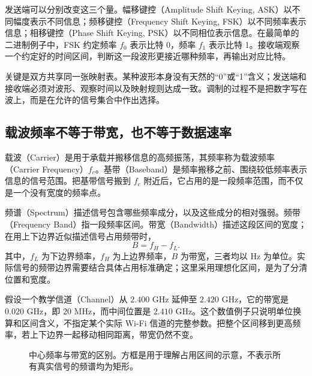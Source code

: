发送端可以分别改变这三个量。幅移键控（Amplitude Shift Keying, ASK）以不同幅度表示不同信息；频移键控（Frequency Shift Keying, FSK）以不同频率表示信息；相移键控（Phase Shift Keying, PSK）以不同相位表示信息。在最简单的二进制例子中，FSK 约定频率 $f_0$ 表示比特 0，频率 $f_1$ 表示比特 1。接收端观察一个约定好的时间区间，判断这一段波形更接近哪种频率，再输出对应比特。

关键是双方共享同一张映射表。某种波形本身没有天然的“0”或“1”含义；发送端和接收端必须对波形、观察时间以及映射规则达成一致。调制的过程不是把数字写在波上，而是在允许的信号集合中作出选择。

\subsection{载波频率不等于带宽，也不等于数据速率}
载波（Carrier）是用于承载并搬移信息的高频振荡，其频率称为载波频率（Carrier Frequency）$f_c$。基带（Baseband）是频率搬移之前、围绕较低频率表示信息的信号范围。把基带信号搬到 $f_c$ 附近后，它占用的是一段频率范围，而不仅是一个没有宽度的频率点。

频谱（Spectrum）描述信号包含哪些频率成分，以及这些成分的相对强弱。频带（Frequency Band）指一段频率区间。带宽（Bandwidth）描述这段区间的宽度；在用上下边界近似描述信号占用频带时，
\begin{equation}
B=f_H-f_L.
\end{equation}
其中，$f_L$ 为下边界频率，$f_H$ 为上边界频率，$B$ 为带宽，三者均以 Hz 为单位。实际信号的频带边界需要结合具体占用标准确定；这里采用理想化区间，是为了分清位置和宽度。

假设一个教学信道（Channel）从 $2.400$ GHz 延伸至 $2.420$ GHz，它的带宽是 $0.020$ GHz，即 $20$ MHz，而中间位置是 $2.410$ GHz。这个数值例子只说明单位换算和区间含义，不指定某个实际 Wi-Fi 信道的完整参数。把整个区间移到更高频率，若上下边界一起移动相同距离，带宽仍然不变。

\begin{figure}[htbp]
\centering
{}
\caption{中心频率与带宽的区别。方框是用于理解占用区间的示意，不表示所有真实信号的频谱均为矩形。}
\end{figure}

